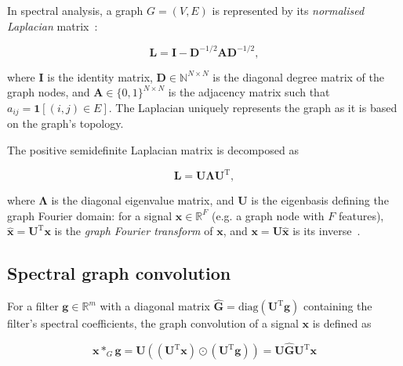 In spectral analysis, a graph $G = (V, E)$ is represented by its \textit{normalised Laplacian} matrix~\cite{defferrard2016convolutional}: 

\begin{equation}
    \mathbf{L} = \mathbf{I} - \mathbf{D}^{-1/2}\mathbf{A}\mathbf{D}^{-1/2},
\end{equation}

where $\mathbf{I}$ is the identity matrix, $\mathbf{D} \in \mathbb{N}^{N \times N}$ is the diagonal degree matrix of the graph nodes, and $\mathbf{A} \in \{0, 1\}^{N \times N}$ is the adjacency matrix such that $a_{ij} = \mathbf{1}[(i, j) \in E]$. The Laplacian uniquely represents the graph as it is based on the graph's topology.

The positive semidefinite Laplacian matrix is decomposed as

\begin{equation}
    \mathbf{L} = \mathbf{U\Lambda U}^\mathrm{T},
\end{equation}

where $\mathbf{\Lambda}$ is the diagonal eigenvalue matrix, and $\mathbf{U}$ is the eigenbasis defining the graph Fourier domain: for a signal $\mathbf{x} \in \mathbb{R}^{F}$ (e.g. a graph node with $F$ features), $\mathbf{\hat{x}} = \mathbf{U}^\mathrm{T}\mathbf{x}$ is the \textit{graph Fourier transform} of $\mathbf{x}$, and $\mathbf{x} = \mathbf{U}\mathbf{\hat{x}}$ is its inverse~\cite{wu2019simplifying}.



\subsection{Spectral graph convolution}

For a filter $\mathbf{g} \in \mathbb{R}^m$ with a diagonal matrix $\mathbf{\hat{G}} = \mathrm{diag}(\mathbf{U}^\mathrm{T}\mathbf{g})$ containing the filter's spectral coefficients, the graph convolution of a signal $\mathbf{x}$ is defined as

\begin{equation}
    \label{eq:convolution}
    \mathbf{x} *_G \mathbf{g} = \mathbf{U}((\mathbf{U}^\mathrm{T}\mathbf{x}) \odot (\mathbf{U}^\mathrm{T}\mathbf{g})) = \mathbf{U}\mathbf{\hat{G}}\mathbf{U}^\mathrm{T}\mathbf{x}
\end{equation}

